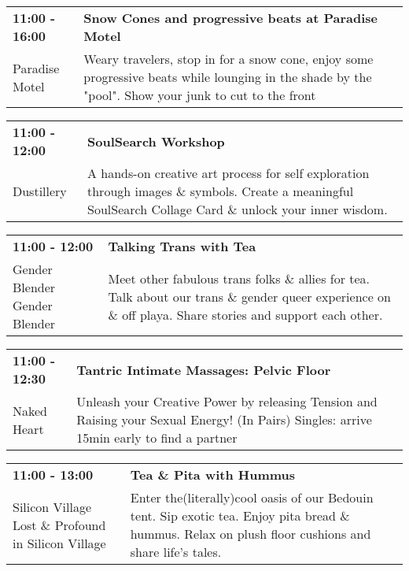 \begin{tabular}{ p{1in} p{2.2in} }
    \textbf{11:00 - 16:00} & \textbf{Snow Cones and progressive beats at Paradise Motel} \\
    Paradise Motel \newline  & Weary travelers, stop in for a snow cone, enjoy some progressive beats while lounging in the shade by the "pool".   Show your junk to cut to the front \\
    \hline 
\end{tabular}
    
\begin{tabular}{ p{1in} p{2.2in} }
    \textbf{11:00 - 12:00} & \textbf{SoulSearch Workshop} \\
    Dustillery \newline  & A hands-on creative art process for self exploration through images \& symbols. Create a meaningful SoulSearch Collage Card \& unlock your inner wisdom. \\
    \hline 
\end{tabular}
    
\begin{tabular}{ p{1in} p{2.2in} }
    \textbf{11:00 - 12:00} & \textbf{Talking Trans with Tea} \\
    Gender Blender \newline Gender Blender & Meet other fabulous trans folks \& allies for tea. Talk about our trans \& gender queer experience on \& off playa. Share stories and support each other. \\
    \hline 
\end{tabular}
    
\begin{tabular}{ p{1in} p{2.2in} }
    \textbf{11:00 - 12:30} & \textbf{Tantric Intimate Massages: Pelvic Floor} \\
    Naked Heart \newline  & Unleash your Creative Power by releasing Tension and Raising your Sexual Energy! (In Pairs) Singles: arrive 15min early to find a partner \\
    \hline 
\end{tabular}
    
\begin{tabular}{ p{1in} p{2.2in} }
    \textbf{11:00 - 13:00} & \textbf{Tea \& Pita with Hummus} \\
    Silicon Village \newline Lost \& Profound in Silicon Village & Enter the(literally)cool oasis of our Bedouin tent. Sip exotic tea. Enjoy pita bread \& hummus. Relax on plush floor cushions and share life's tales. \\
    \hline 
\end{tabular}
    
